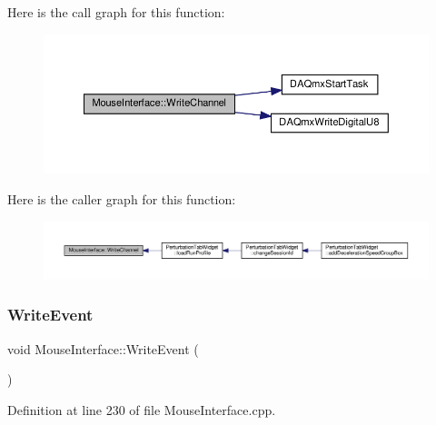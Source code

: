 Here is the call graph for this function\+:
\nopagebreak
\begin{figure}[H]
\begin{center}
\leavevmode
\includegraphics[width=350pt]{class_mouse_interface_a82af3fc9748aa565809317e6395f0696_cgraph}
\end{center}
\end{figure}
Here is the caller graph for this function\+:
\nopagebreak
\begin{figure}[H]
\begin{center}
\leavevmode
\includegraphics[width=350pt]{class_mouse_interface_a82af3fc9748aa565809317e6395f0696_icgraph}
\end{center}
\end{figure}
\mbox{\label{class_mouse_interface_aa70911c968ecc9ac8b6ce7de752d3689}} 
\subsubsection{\texorpdfstring{Write\+Event}{WriteEvent}}
{\footnotesize\ttfamily void Mouse\+Interface\+::\+Write\+Event (\begin{DoxyParamCaption}{ }\end{DoxyParamCaption})\hspace{0.3cm}{\ttfamily [slot]}}



Definition at line 230 of file Mouse\+Interface.\+cpp.

